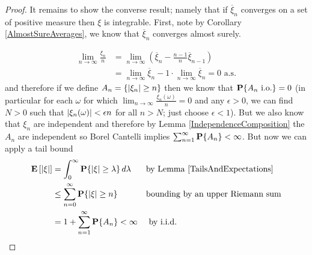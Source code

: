 \begin{proof}
It remains to show the converse result; namely that if
$\overline{\xi}_n$ converges on a set of positive measure then $\xi$
is integrable.  First, note by Corollary \ref{AlmostSureAverages}, we
know that $\overline{\xi}_n$ converges almost surely.

\begin{align*}
\lim_{n \to \infty} \frac{\xi_n}{n} &= \lim_{n \to \infty} \left (
  \overline{\xi}_n - \frac{n-1}{n}   \overline{\xi}_{n-1} \right ) \\
&= \lim_{n \to \infty} \overline{\xi}_n  - 1 \cdot \lim_{n \to \infty}
\overline{\xi}_n = 0 \text{ a.s.}
\end{align*}
and therefore if we define $A_n = \lbrace \left \vert \xi_n \right \vert \geq n \rbrace$
then we know that $\textbf{P}\{A_n \text{ i.o.}\} = 0$ (in particular
for each $\omega$ for which $\lim_{n \to \infty}
\frac{\xi_n(\omega)}{n} = 0$ and any $\epsilon > 0$, we can find $N > 0$ such that
$\left \vert \xi_n(\omega) \right \vert < \epsilon n$ for all $n > N$; just choose
$\epsilon < 1$).  But we also know that $\xi_n$ are independent and
therefore by Lemma \ref{IndependenceComposition} the $A_n$ are
independent so Borel Cantelli implies $\sum_{n=1}^\infty
\textbf{P}\{A_n\} < \infty$.  But now we can apply a tail bound
\begin{align*}
\textbf{E}\left[\left \vert \xi \right \vert\right] &= \int_0^\infty \textbf{P}\{\left \vert \xi \right \vert \geq
  \lambda\} \, d\lambda & & \text{by Lemma \ref{TailsAndExpectations}}
\\
&\leq \sum_{n=0}^\infty \textbf{P}\{\left \vert \xi \right \vert \geq n\} & &
\text{bounding by an upper
  Riemann sum} \\
&= 1 + \sum_{n=1}^\infty \textbf{P}\{A_n\} < \infty & &\text { by i.i.d.}
\end{align*}
\end{proof}
